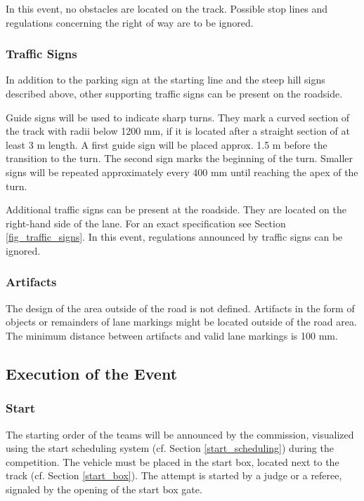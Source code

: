 In this event, no obstacles are located on the track. Possible stop lines and
regulations concerning the right of way are to be ignored.

\subsubsection{Traffic Signs}
\label{traffic_signs}

In addition to the parking sign at the starting line and the steep hill signs
described above, other supporting traffic signs can be present on the roadside.

Guide signs will be used to indicate sharp turns. They mark a curved section of
the track with radii below 1200 mm, if it is located after a straight section
of at least 3 m length. A first guide sign will be placed approx. 1.5 m before
the transition to the turn. The second sign marks the beginning of the turn.
Smaller signs will be repeated approximately every 400 mm until reaching the
apex of the turn.

Additional traffic signs can be present at the roadside. They are located on
the right-hand side of the lane. For an exact specification see Section
\ref{fig_traffic_signs}. In this event, regulations announced by traffic signs
can be ignored.

\subsubsection{Artifacts}
\label{artifacts}

The design of the area outside of the road is not defined. Artifacts in the
form of objects or remainders of lane markings might be located outside of the
road area. The minimum distance between artifacts and valid lane markings is
100 mm.

\subsection{Execution of the Event}

\subsubsection{Start}

The starting order of the teams will be announced by the commission, visualized
using the start scheduling system (cf. Section \ref{start_scheduling}) during
the competition. The vehicle must be placed in the start box, located next to
the track (cf. Section \ref{start_box}). The attempt is started by a judge or a
referee, signaled by the opening of the start box gate.

